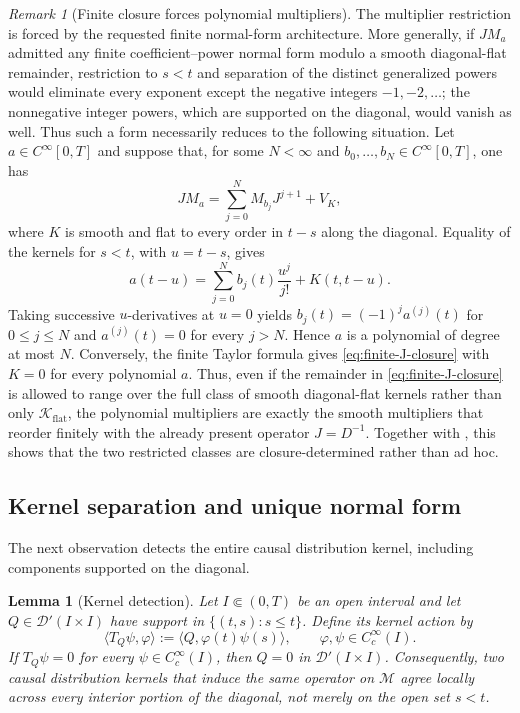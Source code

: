 \documentclass[11pt]{article}
\numberwithin{equation}{section}
\newtheorem{lemma}{Lemma}
\theoremstyle{definition}
\theoremstyle{remark}
\newtheorem{remark}{Remark}
\newcommand{\M}{\mathcal M}
\newcommand{\Kflat}{\mathcal K_{\mathrm{flat}}}
\newcommand{\D}{\mathcal D}
\begin{document}
\begin{remark}[Finite closure forces polynomial multipliers]
The multiplier restriction is forced by the requested finite normal-form
architecture. More generally, if $JM_a$ admitted any finite coefficient--power
normal form modulo a smooth diagonal-flat remainder, restriction to $s<t$ and
separation of the distinct generalized powers would eliminate every exponent
except the negative integers $-1,-2,\ldots$; the nonnegative integer powers,
which are supported on the diagonal, would vanish as well. Thus such a form
necessarily reduces to the following situation. Let $a\in C^\infty[0,T]$ and
suppose that, for some $N<\infty$ and
$b_0,\ldots,b_N\in C^\infty[0,T]$, one has
\begin{equation}
JM_a=\sum_{j=0}^{N}M_{b_j}J^{j+1}+V_K,
\label{eq:finite-J-closure}
\end{equation}
where $K$ is smooth and flat to every order in $t-s$ along the diagonal.
Equality of the kernels for $s<t$, with $u=t-s$, gives
\begin{equation*}
a(t-u)=\sum_{j=0}^{N}b_j(t)\frac{u^j}{j!}+K(t,t-u).
\end{equation*}
Taking successive $u$-derivatives at $u=0$ yields
$b_j(t)=(-1)^ja^{(j)}(t)$ for $0\le j\le N$ and
$a^{(j)}(t)=0$ for every $j>N$. Hence $a$ is a polynomial of degree at most
$N$. Conversely, the finite Taylor formula gives \eqref{eq:finite-J-closure}
with $K=0$ for every polynomial $a$.  Thus, even if the remainder in
\eqref{eq:finite-J-closure} is allowed to range over the full class of smooth
diagonal-flat kernels rather than only $\Kflat$, the polynomial multipliers
are exactly the smooth multipliers that reorder finitely with the already
present operator $J=D^{-1}$. Together with , this shows
that the two restricted classes are closure-determined rather than ad hoc.
\end{remark}

\subsection{Kernel separation and unique normal form}

The next observation detects the entire causal distribution kernel, including components supported on the diagonal.

\begin{lemma}[Kernel detection]\label{lem:kernel-detection}
Let $I\Subset(0,T)$ be an open interval and let $Q\in\D'(I\times I)$ have support in $\{(t,s):s\le t\}$. Define its kernel action by
\begin{equation*}
\langle T_Q\psi,\varphi\rangle:=\langle Q,\varphi(t)\psi(s)\rangle,
\qquad \varphi,\psi\in C_c^\infty(I).
\end{equation*}
If $T_Q\psi=0$ for every $\psi\in C_c^\infty(I)$, then $Q=0$ in $\D'(I\times I)$. Consequently, two causal distribution kernels that induce the same operator on $\M$ agree locally across every interior portion of the diagonal, not merely on the open set $s<t$.
\end{lemma}
\end{document}
